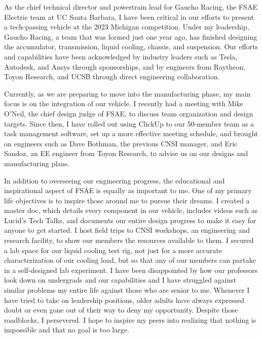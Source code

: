 \documentclass[11pt, letterpaper]{awesome-cv} %
\begin{document}
\makecvheader %

\makelettertitle %


\begin{cvletter}

As the chief technical director and powertrain lead for Gaucho Racing, the FSAE Electric team at UC Santa Barbara, I have been critical in our efforts to present a tech-passing vehicle at the 2023 Michigan competition. Under my leadership, Gaucho Racing, a team that was formed just one year ago, has finished designing the accumulator, transmission, liquid cooling, chassis, and suspension. Our efforts and capabilities have been acknowledged by industry leaders such as Tesla, Autodesk, and Ansys through sponsorships, and by engineers from Raytheon, Toyon Research, and UCSB through direct engineering collaboration. 

Currently, as we are preparing to move into the manufacturing phase, my main focus is on the integration of our vehicle. I recently had a meeting with Mike O'Neil, the chief design judge of FSAE, to discuss team organization and design targets. Since then, I have rolled out using ClickUp to our 50-member team as a task management software, set up a more effective meeting schedule, and brought on engineers such as Dave Bothman, the previous CNSI manager, and Eric Sandoz, an EE engineer from Toyon Research, to advise us on our designs and manufacturing plans.

In addition to overseeing our engineering progress, the educational and inspirational aspect of FSAE is equally as important to me. One of my primary life objectives is to inspire those around me to pursue their dreams. I created a master doc, which details every component in our vehicle, includes videos such as Lucid's Tech Talks, and documents our entire design progress to make it easy for anyone to get started. I host field trips to CNSI workshops, an engineering and research facility, to show our members the resources available to them. I secured a lab space for our liquid cooling test rig, not just for a more accurate characterization of our cooling load, but so that any of our members can partake in a self-designed lab experiment. I have been disappointed by how our professors look down on undergrads and our capabilities and I have struggled against similar problems my entire life against those who are senior to me. Whenever I have tried to take on leadership positions, older adults have always expressed doubt or even gone out of their way to deny my opportunity. Despite those roadblocks, I persevered. I hope to inspire my peers into realizing that nothing is impossible and that no goal is too large.



\end{cvletter}


\makeletterclosing %
\end{document}
